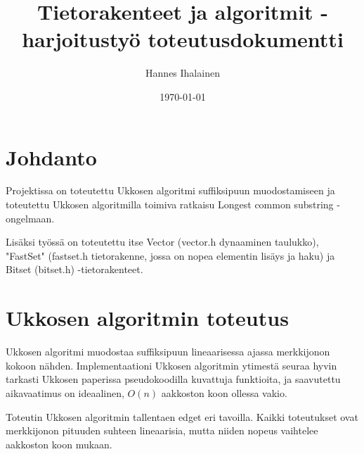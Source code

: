 \documentclass{article}
\title{Tietorakenteet ja algoritmit -harjoitustyö toteutusdokumentti}
\author{Hannes Ihalainen}
\date{\today}
\begin{document}
  \maketitle
  \newpage
  \tableofcontents
  \newpage

  \section{Johdanto}

    Projektissa on toteutettu Ukkosen algoritmi suffiksipuun muodostamiseen ja toteutettu Ukkosen algoritmilla toimiva ratkaisu 
    Longest common substring -ongelmaan.

    Lisäksi työssä on toteutettu itse Vector (vector.h dynaaminen taulukko), "FastSet"
    (fastset.h tietorakenne, jossa on nopea elementin lisäys ja haku) ja Bitset (bitset.h) -tietorakenteet.
    
 \newpage
 \section{Ukkosen algoritmin toteutus}

    Ukkosen algoritmi muodostaa suffiksipuun lineaarisessa ajassa merkkijonon kokoon nähden. Implementaationi Ukkosen
    algoritmin ytimestä seuraa hyvin tarkasti Ukkosen paperissa pseudokoodilla kuvattuja funktioita, ja saavutettu
    aikavaatimus on ideaalinen, $O(n)$ aakkoston koon ollessa vakio.
    
    Toteutin Ukkosen algoritmin tallentaen edget eri tavoilla. Kaikki toteutukset ovat merkkijonon pituuden suhteen
    lineaarisia, mutta niiden nopeus vaihtelee aakkoston koon mukaan.
\end{document}
